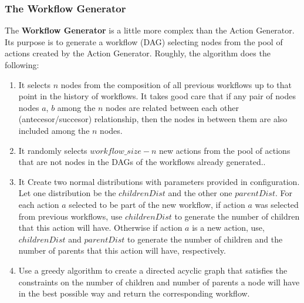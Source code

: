 \subsubsection{The Workflow Generator}
The \textbf{Workflow Generator} is a little more complex than the Action Generator.  Its purpose is to generate a workflow (DAG) selecting nodes from the pool of actions created by the Action Generator. Roughly, the algorithm does the following:
\begin{enumerate}
\item It selects $n$ nodes from the composition of all previous workflows up to that point in the history of workflows. It takes good care that if any pair of nodes nodes $a$, $b$ among the $n$ nodes are related between each other (antecesor/succesor) relationship, then the nodes in between them are also included among the $n$ nodes.

\item It randomly selects $workflow\_size - n$ new actions from the pool of actions that are not nodes in the DAGs of the workflows already generated..

\item It Create two normal distributions with parameters provided in configuration.  Let one distribution be the $childrenDist$ and the other one $parentDist$. For each action $a$ selected to be part of the new workflow, if action $a$ was selected from previous workflows, use $childrenDist$ to generate the number of children that this action will have.  Otherwise if action $a$ is a new action, use, $childrenDist$ and $parentDist$ to generate the number of children and the number of parents that this action will have, respectively.

\item Use a greedy algorithm to create a directed acyclic graph that satisfies the constraints on the number of children and number of parents a node will have in the best possible way and return the corresponding workflow.
\end{enumerate}

